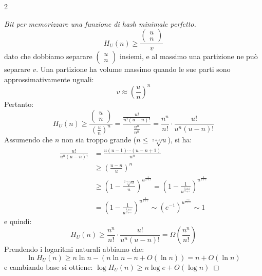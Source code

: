 \documentclass[\main/main.tex]{subfiles}
\begin{document}
\begin{multicols}{2}
\begin{proof}[Bit per memorizzare una funzione di hash minimale perfetto]
    \[
        H_{U}(n) \geq \frac{\left(\begin{array}{l}{u} \\ {n}\end{array}\right)}{v}
    \]
    dato che dobbiamo separare \(\left(\begin{array}{l}{u} \\ {n}\end{array}\right)\) insiemi, e al massimo una partizione ne può separare \(v\). Una partizione ha volume massimo quando le sue parti sono approssimativamente uguali:
    \[
        v \approx\left(\frac{u}{n}\right)^{n}
    \]
    Pertanto:
    \[
        H_{U}(n) \geq \frac{\left(\begin{array}{c}{u} \\ {n}\end{array}\right)}{\left(\frac{u}{n}\right)^{n}}=\frac{\frac{u !}{n !(u-n) !}}{\frac{u^{n}}{n^{n}}}=\frac{n^{n}}{n !} \cdot \frac{u !}{u^{n}(u-n) !}
    \]
    Assumendo che \(n\) non sia troppo grande (\(n \leq \sqrt[2+\varepsilon]{u}\)), si ha:
    \begin{align*}
        \frac{u !}{u^{n}(u-n) !}&=\frac{u(u-1) \cdots(u-n+1)}{u^{n}}\\
        &\geq\left(\frac{u-n}{u}\right)^{n}\\
        &\geq\left(1-\frac{\sqrt[2+\varepsilon]{u}}{u}\right)^{u^{\frac{1}{2+\varepsilon}}}=\left(1-\frac{1}{u^{\frac{1+\varepsilon}{2+\varepsilon}}}\right)^{u^{\frac{1}{2+\varepsilon}}}\\
        &=\left(1-\frac{1}{u^{\frac{1+\varepsilon}{2+\varepsilon}}}\right)^{u^{\frac{1}{2+\varepsilon}}}\sim\left(e^{-1}\right)^{u^{\frac{-\varepsilon}{2+\varepsilon}}} \sim 1
    \end{align*}
    e quindi:
    \[
        H_{U}(n) \geq \frac{n^{n}}{n !} \cdot \frac{u !}{u^{n}(u-n) !}=\Omega\left(\frac{n^{n}}{n !}\right)
    \]
    Prendendo i logaritmi naturali abbiamo che:
    \[
        \ln H_{U}(n) \geq n \ln n-(n \ln n-n+O(\ln n))=n+O(\ln n)
    \]
    e cambiando base si ottiene: \(
        \log H_{U}(n) \geq n \log e+O(\log n)
    \)
\end{proof}
\end{multicols}
\end{document}
